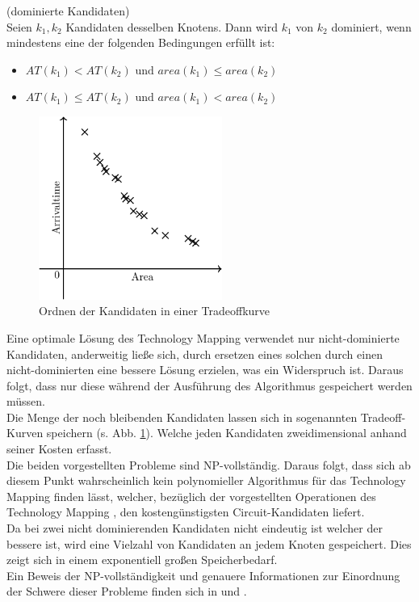 \documentclass[11pt, a4paper, german]{article}
\newcommand{\TM}{Technology  Mapping }
\begin{document}
\begin{definition}{(dominierte Kandidaten)}\\
	Seien $k_1, k_2$ Kandidaten desselben Knotens. Dann wird $k_1$ von $k_2$ dominiert, wenn mindestens eine der folgenden Bedingungen erfüllt ist:
	\begin{itemize}
	\item $AT(k_1) < AT(k_2) \text { und  }area(k_1) \leq area(k_2)$
	\item $	AT(k_1) \leq AT(k_2) \text{ und } area(k_1) < area(k_2)$	
	\end{itemize}
\end{definition}

 \begin{figure}
		\includegraphics[width = 6cm]{pictures/compiled/tradeoff_kurve}
		\caption{Ordnen der Kandidaten in einer Tradeoffkurve}
		\label{bild:tradeoff_kurve}
\end{figure}
Eine optimale Lösung des \TM verwendet nur nicht-dominierte Kandidaten, anderweitig ließe sich, durch ersetzen eines solchen durch einen nicht-dominierten eine bessere Lösung erzielen, was ein Widerspruch ist. Daraus folgt, dass nur diese während der Ausführung des Algorithmus gespeichert werden müssen.\\
Die Menge der noch bleibenden Kandidaten lassen sich in sogenannten Tradeoff-Kurven speichern (s. Abb. \ref{bild:tradeoff_kurve}). Welche jeden Kandidaten zweidimensional anhand seiner Kosten erfasst.\\

Die beiden vorgestellten Probleme sind NP-vollständig. Daraus folgt, dass sich ab diesem Punkt wahrscheinlich  kein polynomieller Algorithmus für das \TM finden lässt, welcher, bezüglich der vorgestellten Operationen des \TM, den kostengünstigsten Circuit-Kandidaten liefert.\\
Da bei zwei nicht dominierenden Kandidaten nicht eindeutig ist welcher der bessere ist,  wird eine Vielzahl von Kandidaten an jedem Knoten gespeichert. Dies zeigt sich in einem exponentiell großen Speicherbedarf. \\
Ein Beweis der NP-vollständigkeit und genauere Informationen zur Einordnung der Schwere dieser Probleme finden sich in \cite{ComplexitySynthesis} und \citep{Elbert}. 
\end{document}
